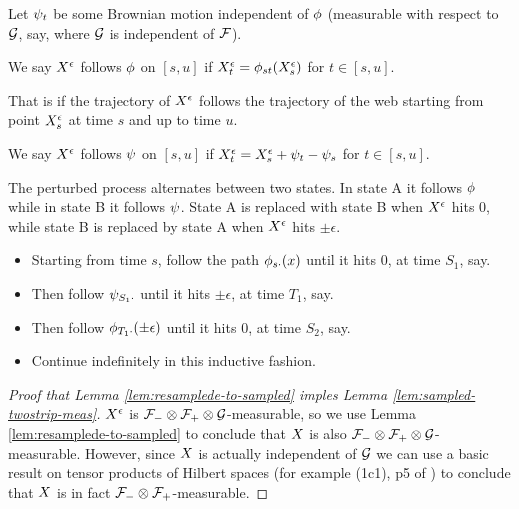 {{\begin{definition}
  Let $\psi_{t}$ be
  some Brownian motion independent of $\phi$ (measurable with
  respect to $\mathcal{G}$, say, where $\mathcal{G}$ is independent of
  $\mathcal{F}$).

  We say $X^{\epsilon}$ follows $\phi$ on $[s,u]$ if
  $X^{\epsilon}_t = \phi_{{s}{t}}(X^{\epsilon}_s)$ for $t \in [s,u]$.

  That is if the trajectory of $X^{\epsilon}$ follows the trajectory of
  the web starting from point $X^{\epsilon}_s$ at time $s$ and up to time $u$.

  We say $X^{\epsilon}$ follows $\psi$ on $[s,u]$ if
  $X^{\epsilon}_t = X^{\epsilon}_s + \psi_{t} - \psi_{s}$ for $t \in [s,u]$.

  The perturbed process alternates between two states.  In state A it follows 
  $\phi$ while in state B it follows $\psi$. State A is replaced with state B 
  when $X^{\epsilon}$ hits $0$, while state B is replaced by state A when 
  $X^{\epsilon}$ hits $\pm \epsilon$. 

  \begin{itemize}
  \item Starting from time $s$, follow the path $\phi_{{s}{\cdot}}(x)$
    until it hits $0$, at time $S_1$, say.
  \item Then follow $\psi_{{S_1}{\cdot}}$ until it hits $\pm \epsilon$, at
    time $T_1$, say.
  \item Then follow $\phi_{{T_1}{\cdot}}(\pm \epsilon)$ until it hits $0$, at
    time $S_2$, say.
  \item Continue indefinitely in this inductive fashion.
  \end{itemize}
\end{definition}
}

\begin{lemma}
  \label{lem:resamplede-to-sampled}
  \statementoflemresampledetosampled
\end{lemma}

\begin{proof}[Proof that Lemma \ref{lem:resamplede-to-sampled}
    imples Lemma \ref{lem:sampled-twostrip-meas}]
  $X^{\epsilon}$ is $\mathcal{F}_{-} \otimes \mathcal{F}_{+} \otimes \mathcal{G}$-measurable, so we use Lemma
  \ref{lem:resamplede-to-sampled} to conclude that $X$ is also
  $\mathcal{F}_{-} \otimes \mathcal{F}_{+} \otimes \mathcal{G}$-measurable.  However, since $X$ is
  actually independent of $\mathcal{G}$ we can use a basic result on
  tensor products of Hilbert spaces (for example (1c1), p5 of
  \cite{tsirelson-completion}) to conclude that $X$ is
  in fact $\mathcal{F}_{-} \otimes \mathcal{F}_{+}$-measurable.
\end{proof}
}
